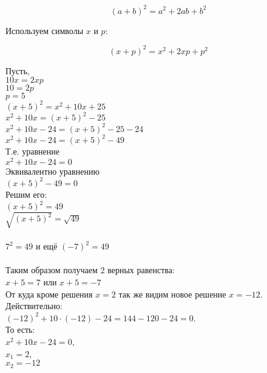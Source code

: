 \begin{equation}
  \left( a + b \right)^2 = a^2 + 2ab + b^2
\end{equation}

Используем символы $x$ и $p$:

\begin{equation*}
  \left( x + p \right)^2 = x^2 + 2xp + p^2
\end{equation*}

Пусть,\\
$ 10x = 2xp $ \\
$ 10 = 2p   $ \\
$ p = 5     $ \\
$ \left( x + 5 \right)^2 = x^2 + 10x + 25 $ \\
$ x^2 + 10x = \left( x + 5 \right)^2 - 25 $ \\
$ x^2 + 10x - 24 = \left( x + 5 \right)^2 - 25 - 24$ \\
$ x^2 + 10x - 24 = \left( x + 5 \right)^2 - 49$ \\
Т.е. уравнение \\
$ x^2 + 10x - 24 = 0 $ \\
Эквивалентно уравнению \\
$ \left( x + 5 \right)^2 - 49 = 0 $ \\
Решим его: \\
$ \left( x + 5 \right)^2 = 49 $ \\
$ \sqrt{\left( x + 5 \right)^2} = \sqrt{49} $ \\
\\
$ 7^2 = 49$ и ещё $ (-7)^2 = 49 $ \\
\\
Таким образом получаем 2 верных равенства: \\
$x + 5 = 7$ \qquad или \qquad $x + 5 = -7$ \\
От куда кроме решения $x=2$ так же видим новое решение $x=-12$. Действительно:\\
$(-12)^2 + 10 \cdot (-12) - 24 = 144 - 120 -24 = 0$.\\
То есть: \\
$ x^2 + 10x - 24 = 0 $, \\
$ x_1 = 2 $, \\
$ x_2 = -12 $

